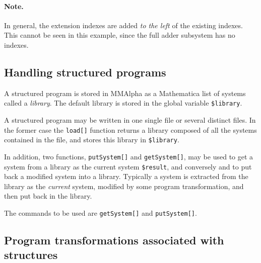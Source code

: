 \documentclass[12pt]{article}
\newcommand{\MMA}{{\sc MMAlpha}}
\newcommand{\mmalfa}{\MMA}
\newcommand{\mma}{{Mathematica}}
\begin{document}
\paragraph{Note.} In general, the extension indexes are 
added {\em to the left} of the existing indexes. This
cannot be seen in this example, since the full adder subsystem
has no indexes. 

\subsection{Handling structured programs}
A structured program is stored in {\mmalfa{}} as a {\mma{}} list of
systems called a \emph{library}. The default library is stored in the
global variable \verb!$library!.

A structured program may be written in one single file or several
distinct files.  In the former case the \texttt{load[]} function
returns a library composed of all the systems contained in the file,
and stores this library in \verb!$library!. %

In addition, two functions, \texttt{putSystem[]} and
\texttt{getSystem[]}, may be used to get a system from a library
as the current system \texttt{\$result}, and conversely
and to put back a modified system into a library. 
Typically a
system is extracted from the library as the {\em current}
system, modified by some program
transformation, and then put back in the library.

The commands to be used are \texttt{getSystem[]} and
\texttt{putSystem[]}.

\subsection{Program transformations associated with structures}
\end{document}
